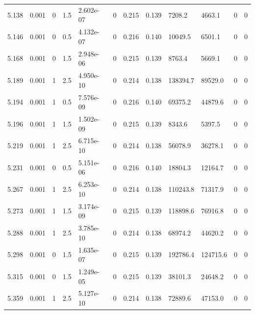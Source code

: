 \documentclass[preview]{standalone}
\begin{document}
{{{{{{{{\begin{tabular}{L{1.2cm}C{1.2cm} C{0.3cm}C{0.5cm} C{1.4cm}C{1.4cm} C{1.4cm}C{1.4cm} C{1.6cm}C{1.6cm} C{1.6cm}C{1.6cm}}
  5.138  &  0.001  & 0     & 1.5 &  2.602e-07  & 0  &  0.215&   0.139& 7208.2 & 4663.1   &  0 & 0  \\ 
  5.146  &  0.001  & 0     & 0.5 &  4.132e-07  & 0  &  0.216&   0.140& 10049.5 & 6501.1   &  0 & 0  \\ 
  5.168  &  0.001  & 0     & 1.5 &  2.948e-06  & 0  &  0.215&   0.139& 8763.4 & 5669.1   &  0 & 0  \\ 
  5.189  &  0.001  & 1     & 2.5 &  4.950e-10  & 0  &  0.214&   0.138& 138394.7 & 89529.0   &  0 & 0  \\ 
  5.194  &  0.001  & 1     & 0.5 &  7.576e-09  & 0  &  0.216&   0.140& 69375.2 & 44879.6   &  0 & 0  \\ 
  5.196  &  0.001  & 1     & 1.5 &  1.502e-09  & 0  &  0.215&   0.139& 8343.6 & 5397.5   &  0 & 0  \\ 
  5.219  &  0.001  & 1     & 2.5 &  6.715e-10  & 0  &  0.214&   0.138& 56078.9 & 36278.1   &  0 & 0  \\ 
  5.231  &  0.001  & 0     & 0.5 &  5.151e-06  & 0  &  0.216&   0.140& 18804.3 & 12164.7   &  0 & 0  \\ 
  5.267  &  0.001  & 1     & 2.5 &  6.253e-10  & 0  &  0.214&   0.138& 110243.8 & 71317.9   &  0 & 0  \\ 
  5.273  &  0.001  & 1     & 1.5 &  3.174e-09  & 0  &  0.215&   0.139& 118898.6 & 76916.8   &  0 & 0  \\ 
  5.288  &  0.001  & 1     & 2.5 &  3.785e-10  & 0  &  0.214&   0.138& 68974.2 & 44620.2   &  0 & 0  \\ 
  5.298  &  0.001  & 0     & 1.5 &  1.635e-07  & 0  &  0.215&   0.139& 192786.4 & 124715.6   &  0 & 0  \\ 
  5.315  &  0.001  & 0     & 1.5 &  1.249e-05  & 0  &  0.215&   0.139& 38101.3 & 24648.2   &  0 & 0  \\ 
  5.359  &  0.001  & 1     & 2.5 &  5.127e-10  & 0  &  0.214&   0.138& 72889.6 & 47153.0   &  0 & 0  \\ 
\hline 
\end{tabular} 

}}}}}}}}
\end{document}
